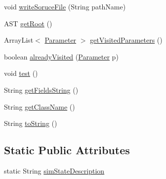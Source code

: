 \begin{DoxyCompactItemize}
void \hyperlink{classit_1_1isislab_1_1masonassisteddocumentation_1_1mason_1_1analizer_1_1_sim_state_analizer_a15e27e8109663869d4636f2c08c1af59}{write\-Soruce\-File} (String path\-Name)
\item 
A\-S\-T \hyperlink{classit_1_1isislab_1_1masonassisteddocumentation_1_1mason_1_1analizer_1_1_sim_state_analizer_ad271c4ee4ffe808dcaa5fecc39cb7bd4}{get\-Root} ()
\item 
Array\-List$<$ \hyperlink{classit_1_1isislab_1_1masonassisteddocumentation_1_1mason_1_1analizer_1_1_parameter}{Parameter} $>$ \hyperlink{classit_1_1isislab_1_1masonassisteddocumentation_1_1mason_1_1analizer_1_1_sim_state_analizer_a9fb2508f0bb14958d8aa2e409ae41f8d}{get\-Visited\-Parameters} ()
\item 
boolean \hyperlink{classit_1_1isislab_1_1masonassisteddocumentation_1_1mason_1_1analizer_1_1_sim_state_analizer_a0a0e3dd3cbc27027c93a4f935382ac55}{already\-Visited} (\hyperlink{classit_1_1isislab_1_1masonassisteddocumentation_1_1mason_1_1analizer_1_1_parameter}{Parameter} p)
\item 
void \hyperlink{classit_1_1isislab_1_1masonassisteddocumentation_1_1mason_1_1analizer_1_1_sim_state_analizer_a6c5d3f04cc9c6fa5e01c1e50166c09ea}{test} ()
\item 
String \hyperlink{classit_1_1isislab_1_1masonassisteddocumentation_1_1mason_1_1analizer_1_1_sim_state_analizer_a592724e3534a0e18a3ef68bbf502fd33}{get\-Fields\-String} ()
\item 
String \hyperlink{classit_1_1isislab_1_1masonassisteddocumentation_1_1mason_1_1analizer_1_1_sim_state_analizer_a9d891a1b9c5b9fc2e83bca09df312f2b}{get\-Class\-Name} ()
\item 
String \hyperlink{classit_1_1isislab_1_1masonassisteddocumentation_1_1mason_1_1analizer_1_1_sim_state_analizer_a14f8302dff6fb0e3a6230c7e53468f41}{to\-String} ()
\end{DoxyCompactItemize}
\subsection*{Static Public Attributes}
\begin{DoxyCompactItemize}
\item 
static String \hyperlink{classit_1_1isislab_1_1masonassisteddocumentation_1_1mason_1_1analizer_1_1_sim_state_analizer_ab98fca6fef047e90490ba9f87cc5fcc0}{sim\-State\-Description}
\end{DoxyCompactItemize}
